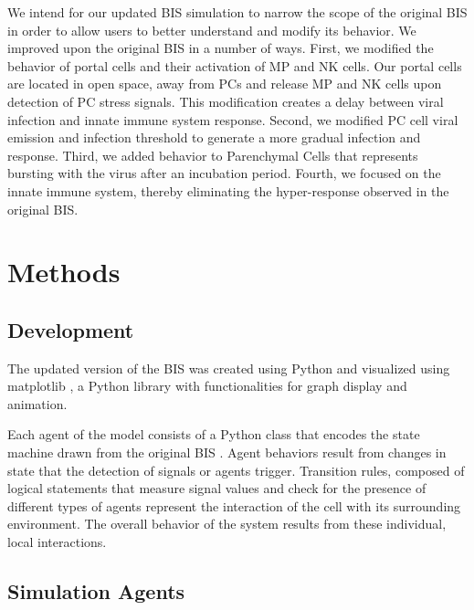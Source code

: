 \documentclass[10pt,conference]{IEEEtran}
\begin{document}
\indent
We intend for our updated BIS simulation to narrow the scope of the original BIS in order to allow users to better understand and modify its 
behavior. We improved upon the original BIS in a number of ways. First, we modified the behavior of portal cells and their activation of MP 
and NK cells. Our portal cells are located in open space, away from PCs and release MP and NK cells upon detection of PC stress signals. 
This modification creates a delay between viral infection and innate immune system response. Second, we modified PC cell viral emission 
and infection threshold to generate a more gradual infection and response. Third, we added behavior to Parenchymal Cells that represents 
bursting with the virus after an incubation period. Fourth, we focused on the innate immune system, thereby eliminating the hyper-response 
observed in the original BIS.

\vspace{.5in}
\section{Methods}
\subsection{Development}
The updated version of the BIS was created using Python and visualized using matplotlib \cite{Hunter:2007}, a Python library with 
functionalities for graph display and animation.

\indent
Each agent of the model consists of a Python class that encodes the state machine drawn from the original BIS \cite{Folcik:2007}. Agent 
behaviors result from changes in state that the detection of signals or agents trigger. Transition rules, composed of logical statements that 
measure signal values and check for the presence of different types of agents represent the interaction of the cell with its surrounding 
environment. The overall behavior of the system results from these individual, local interactions.

\subsection{Simulation Agents}
\end{document}
